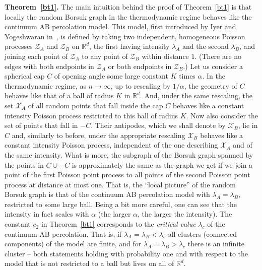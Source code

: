 \documentclass[11pt]{article}%
\newcommand{\Xcal}[0]{\ensuremath{{\mathcal X}}}
\newcommand{\Zcal}[0]{\ensuremath{{\mathcal Z}}}
\newcommand{\eR}[0]{\ensuremath{ \mathbb R}}
\begin{document}
{\bf Theorem~\ref{bt1}.}
The main intuition behind the proof of Theorem~\ref{bt1} is that locally the random Borsuk graph in the 
thermodynamic regime behaves like the continuum AB percolation model.
This model, first introduced by Iyer and Yogeshwaran in~\cite{IyerYogesh}, is defined by taking two 
independent, homogeneous Poisson processes $\Zcal_A$ and $\Zcal_B$ on $\eR^d$, the 
first having intensity $\lambda_A$ and the second $\lambda_B$, and joining each point 
of $\Zcal_A$ to any point of $\Zcal_B$ within distance $1$. (There are no edges with 
both endpoints in $\Zcal_A$ or both endpoints in $\Zcal_B$.)
Let us consider a spherical cap $C$ of opening angle some large constant $K$ times $\alpha$. 
In the thermodynamic regime, as $n\to\infty$, up to rescaling by $1/\alpha$, the geometry of $C$ 
behaves like that of a ball of radius $K$ in $\eR^d$. 
And, under the same rescaling, the set $\Xcal_A$ of all random points that fall inside the cap $C$ behaves like a constant 
intensity Poisson process restricted to this ball of radius $K$. 
Now also consider the set of points that fall in $-C$. Their antipodes, which we 
shall denote by $\Xcal_B$, lie in $C$ and, similarly to before, under the appropriate rescaling $\Xcal_B$ behaves like 
a constant intensity Poisson process, independent of the one describing $\Xcal_A$ and of the same intensity. 
What is more, the subgraph of the Borsuk graph spanned by the 
points in $C \cup -C$ is approximately the same as the graph we get if we join a point of the first 
Poisson point process to all points of the second Poisson point process at distance at most one.
That is, the ``local picture'' of the random Borsuk graph is that of 
the continuum AB percolation model with $\lambda_A = \lambda_B$, restricted to some large ball.
Being a bit more careful, one can see that the intensity in fact scales with $\alpha$ (the larger $\alpha$, 
the larger the intensity).
The constant $c_2$ in Theorem~\ref{bt1} corresponds to the {\em critical value} $\lambda_c$ of the continuum AB percolation.
That is, if $\lambda_A=\lambda_B < \lambda_c$ all clusters (connected components) of the model  are finite, and for 
$\lambda_A=\lambda_B > \lambda_c$ there is an infinite cluster -- both statements holding with probability one
and with respect to the model that is not restricted to a ball but lives on all of $\eR^d$.
\end{document}
